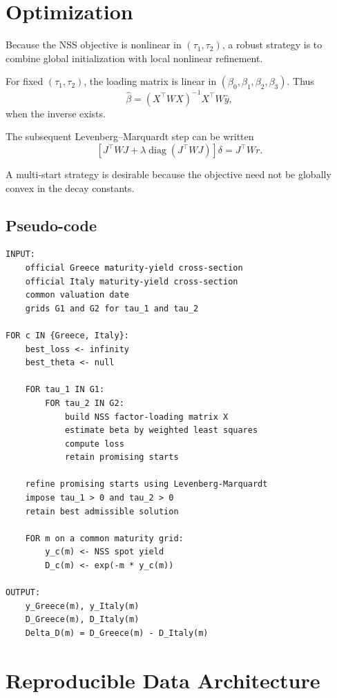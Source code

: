 \documentclass[a4paper,10pt]{article}
\theoremstyle{remark}
\begin{document}
\section{Optimization}

Because the NSS objective is nonlinear in $(\tau_1,\tau_2)$, a robust strategy is to combine global initialization with local nonlinear refinement.

For fixed $(\tau_1,\tau_2)$, the loading matrix is linear in $(\beta_0,\beta_1,\beta_2,\beta_3)$. Thus
\begin{equation}
\hat\beta=(X^\top W X)^{-1}X^\top W\hat y,
\end{equation}
when the inverse exists.

The subsequent Levenberg--Marquardt step can be written
\begin{equation}
\left[J^\top WJ+\lambda\operatorname{diag}(J^\top WJ)\right]\delta
=J^\top Wr.
\end{equation}

A multi-start strategy is desirable because the objective need not be globally convex in the decay constants.

\subsection{Pseudo-code}

\begin{verbatim}
INPUT:
    official Greece maturity-yield cross-section
    official Italy maturity-yield cross-section
    common valuation date
    grids G1 and G2 for tau_1 and tau_2

FOR c IN {Greece, Italy}:
    best_loss <- infinity
    best_theta <- null

    FOR tau_1 IN G1:
        FOR tau_2 IN G2:
            build NSS factor-loading matrix X
            estimate beta by weighted least squares
            compute loss
            retain promising starts

    refine promising starts using Levenberg-Marquardt
    impose tau_1 > 0 and tau_2 > 0
    retain best admissible solution

    FOR m on a common maturity grid:
        y_c(m) <- NSS spot yield
        D_c(m) <- exp(-m * y_c(m))

OUTPUT:
    y_Greece(m), y_Italy(m)
    D_Greece(m), D_Italy(m)
    Delta_D(m) = D_Greece(m) - D_Italy(m)
\end{verbatim}

\section{Reproducible Data Architecture}
\end{document}
